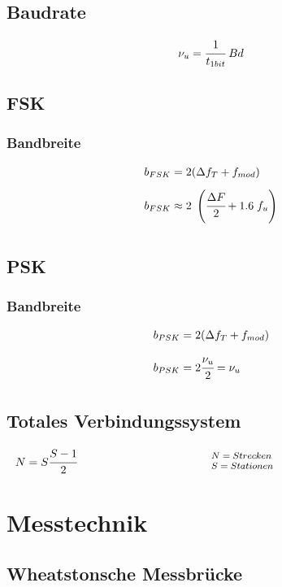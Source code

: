 \documentclass[12pt,a5paper,ngerman,titlepage]{article}
\begin{document}
\subsection{Baudrate}
$$\nu_{u}=\cfrac{1}{t_{1bit}} \; Bd$$

\subsection{FSK}
\subsubsection{Bandbreite}
\begin{align*}
&b_{FSK} = 2(\Delta f_{T} + f_{mod}) \\[5pt]
&b_{FSK} \approx 2 \; \left(\cfrac{\Delta F}{2}+1.6 \; f_{u} \right)\\[5pt]
\end{align*}

\subsection{PSK}
\subsubsection{Bandbreite}
\begin{align*}
&b_{PSK} = 2(\Delta f_{T} + f_{mod}) \\[5pt]
&b_{PSK} = 2 \cfrac{\nu_{u}}{2} = \nu_{u} \\[5pt]
\end{align*}

\subsection{Totales Verbindungssystem}
\[
\begin{minipage}{.5\linewidth}
  $N=S\cfrac{S-1}{2}$
\end{minipage}%
\begin{minipage}{.5\linewidth}
  \fontsize{8pt}{9pt}\selectfont
  $N = Strecken$ \\
  $S = Stationen$

\end{minipage}
\]

\newpage
\section{Messtechnik}
\subsection{Wheatstonsche Messbrücke}
\end{document}
